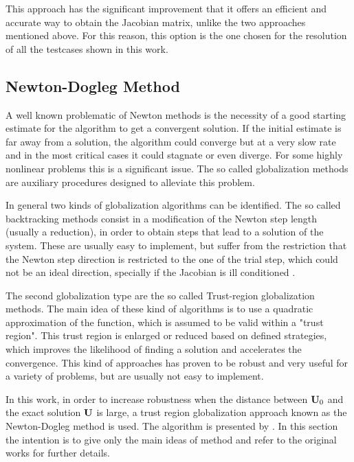 This approach has the significant improvement that it offers an efficient and accurate way to obtain the Jacobian matrix, unlike the two approaches mentioned above. For this reason, this option is the one chosen for the resolution of all the testcases shown in this work.



\subsection{Newton-Dogleg Method} \label{sec:Newton}

A well known problematic of Newton methods is the necessity of a good starting estimate for the algorithm to get a convergent solution. If the initial estimate is far away from a solution, the algorithm could converge but at a very slow rate and in the most critical cases it could stagnate or even diverge.  For some highly nonlinear problems this is a significant issue. The so called globalization methods are auxiliary procedures designed to alleviate  this problem. 

In general two kinds of globalization algorithms can be identified. The so called backtracking methods consist in a modification of the Newton step length (usually a reduction), in order to obtain steps that lead to a solution of the system. These are usually easy to implement, but suffer from the restriction that the Newton step direction is restricted to the one of the trial step, which could not be an ideal direction, specially if the Jacobian is ill conditioned \parencite{pawlowskiGlobalizationTechniquesNewton2006}. 

The second globalization type are the so called Trust-region globalization methods. The main idea of these kind of algorithms is to use a quadratic approximation of the function, which is assumed to be valid within a "trust region". This trust region is enlarged or reduced based on defined strategies, which improves the likelihood of finding a solution and accelerates the convergence. This kind of approaches has proven to be robust and  very useful for a variety of problems, but are usually not easy to implement. 

In this work, in order to increase robustness when the distance between $\textbf{U}_0$ and the exact solution $\textbf{U}$ is large, a trust region globalization approach known as the Newton-Dogleg method is used. The algorithm is presented by \textcite{pawlowskiGlobalizationTechniquesNewton2006,pawlowskiInexactNewtonDogleg2008}. In this section the intention is to give only the main ideas of method and refer to the original works for further details. 


